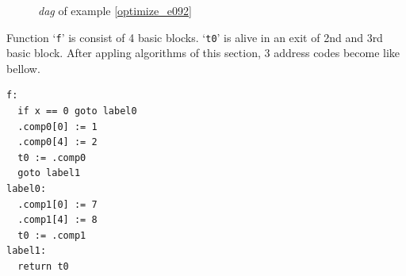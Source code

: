 \begin{Example}
\begin{figure}[htbp]
\begin{center}
\caption{{\em dag} of example \ref{optimize_e092}}
\label{optimize_e093}
\end{center}
\end{figure}
Function `{\tt{f}}' is consist of 4 basic blocks.
`{\tt{t0}}' is
alive in an exit of 2nd and 3rd basic block.
After appling algorithms of this section,
3 address codes become like bellow.
\begin{verbatim}
f:
  if x == 0 goto label0
  .comp0[0] := 1
  .comp0[4] := 2
  t0 := .comp0
  goto label1
label0:
  .comp1[0] := 7
  .comp1[4] := 8
  t0 := .comp1
label1:
  return t0
\end{verbatim}
\end{Example}

\begin{Example}
\label{optimize_e094}
\begin{verbatim}


\end{verbatim}
\end{Example}
